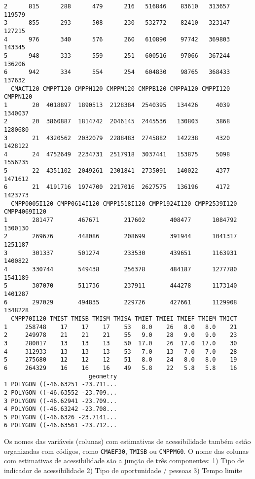 \documentclass[
  letterpaper,
  DIV=11,
  numbers=noendperiod]{scrreprt}
\begin{document}
\begin{verbatim}
2      815      288      479      216   516846    83610   313657   119579
3      855      293      508      230   532772    82410   323147   127215
4      976      340      576      260   610890    97742   369803   143345
5      948      333      559      251   600516    97066   367244   136206
6      942      334      554      254   604830    98765   368433   137632
  CMACT120 CMPPT120 CMPPH120 CMPPM120 CMPPB120 CMPPA120 CMPPI120 CMPPN120
1       20  4018897  1890513  2128384  2540395   134426     4039  1340037
2       20  3860887  1814742  2046145  2445536   130803     3868  1280680
3       21  4320562  2032079  2288483  2745882   142238     4320  1428122
4       24  4752649  2234731  2517918  3037441   153875     5098  1556235
5       22  4351102  2049261  2301841  2735091   140022     4377  1471612
6       21  4191716  1974700  2217016  2627575   136196     4172  1423773
  CMPP0005I120 CMPP0614I120 CMPP1518I120 CMPP1924I120 CMPP2539I120 CMPP4069I120
1       281477       467671       217602       408477      1084792      1300130
2       269676       448086       208699       391944      1041317      1251187
3       301337       501274       233530       439651      1163931      1400822
4       330744       549438       256378       484187      1277780      1541189
5       307070       511736       237911       444278      1173140      1401287
6       297029       494835       229726       427661      1129908      1348228
  CMPP70I120 TMIST TMISB TMISM TMISA TMIET TMIEI TMIEF TMIEM TMICT
1     258748    17    17    17    53   8.0    26   8.0   8.0    21
2     249978    21    21    21    55   9.0    28   9.0   9.0    23
3     280017    13    13    13    50  17.0    26  17.0  17.0    30
4     312933    13    13    13    53   7.0    13   7.0   7.0    28
5     275680    12    12    12    51   8.0    24   8.0   8.0    19
6     264329    16    16    16    49   5.8    22   5.8   5.8    16
                        geometry
1 POLYGON ((-46.63251 -23.711...
2 POLYGON ((-46.63552 -23.709...
3 POLYGON ((-46.62941 -23.709...
4 POLYGON ((-46.63242 -23.708...
5 POLYGON ((-46.6326 -23.7141...
6 POLYGON ((-46.63561 -23.712...
\end{verbatim}

Os nomes das variáveis (colunas) com estimativas de acessibilidade
também estão organizadas com códigos, como \texttt{CMAEF30},
\texttt{TMISB} ou \texttt{CMPPM60}. O nome das colunas com estimativas
de acessibilidade são a junção de três componentes: 1) Tipo de indicador
de acessibilidade 2) Tipo de oportunidade / pessoas 3) Tempo limite
\end{document}
